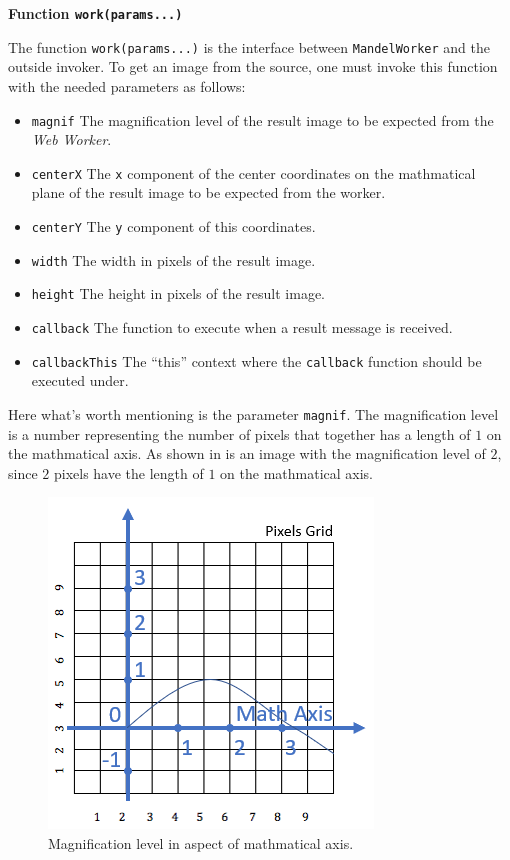 \textbf{Function \texttt{work(params...)}}

The function \texttt{work(params...)} is the interface between \texttt{MandelWorker} and the outside invoker. To get an image from the source, one must invoke this function with the needed parameters as follows:

\begin{itemize}
  \item \texttt{magnif} The magnification level of the result image to be expected from the \emph{Web Worker}.
  \item \texttt{centerX} The \texttt{x} component of the center coordinates on the mathmatical plane of the result image to be expected from the worker.
  \item \texttt{centerY} The \texttt{y} component of this coordinates.
  \item \texttt{width} The width in pixels of the result image.
  \item \texttt{height} The height in pixels of the result image.
  \item \texttt{callback} The function to execute when a result message is received.
  \item \texttt{callbackThis} The ``this'' context where the \texttt{callback} function should be executed under.
\end{itemize}

Here what's worth mentioning is the parameter \texttt{magnif}. The magnification level is a number representing the number of pixels that together has a length of $1$ on the mathmatical axis. As shown in  is an image with the magnification level of $2$, since $2$ pixels have the length of $1$ on the mathmatical axis.

\begin{figure}[th]
\centering
\includegraphics[keepaspectratio]{Figures/Chapter4/magnif.png}
\decoRule
\caption[Magnification Level]{Magnification level in aspect of mathmatical axis.}
\label{fig:magnif}
\end{figure}

